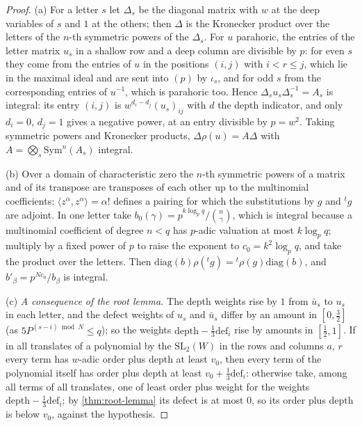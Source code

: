\begin{proof}
(a) For a letter $s$ let $\Delta_s$ be the diagonal matrix with $w$ at the deep variables of $s$ and $1$ at the others; then $\Delta$ is the Kronecker product over the letters of the $n$-th symmetric powers of the $\Delta_s$. For $u$ parahoric, the entries of the letter matrix $u_s$ in a shallow row and a deep column are divisible by $p$: for even $s$ they come from the entries of $u$ in the positions
$(i,j)$ with $i<r\le j$, which lie in the maximal ideal and are sent into $(p)$ by $\iota_s$, and for odd $s$ from the corresponding entries of $u^{-1}$, which is parahoric too. Hence $\Delta_su_s\Delta_s^{-1}=A_s$ is integral: its entry $(i,j)$ is $w^{d_i-d_j}(u_s)_{ij}$ with $d$ the depth indicator, and only $d_i=0$, $d_j=1$ gives a negative power, at an entry divisible by $p=w^2$. Taking symmetric powers
and Kronecker products, $\Delta\rho(u)=A\Delta$ with $A=\bigotimes_s\mathrm{Sym}^n(A_s)$ integral.

(b) Over a domain of characteristic zero the $n$-th symmetric powers of a matrix and of its transpose are transposes of each other up to the multinomial coefficients: $\langle z^\alpha,z^\alpha\rangle=\alpha!$ defines a pairing for which the substitutions by $g$ and ${}^tg$ are adjoint. In one letter take $b_0(\gamma)=p^{k\log_pq}/\binom n\gamma$, which is integral because a multinomial coefficient
of degree $n<q$ has $p$-adic valuation at most $k\log_pq$; multiply by a fixed power of $p$ to raise the exponent to $c_0=k^2\log_pq$, and take the product over the letters. Then $\mathrm{diag}(b)\rho({}^tg)={}^t\rho(g)\mathrm{diag}(b)$, and $b'_\beta=p^{Nc_0}/b_\beta$ is integral.

(c) \emph{A consequence of the root lemma.} The depth weights rise by $1$ from $\bar u_s$ to $u_s$ in each letter, and the defect weights of $u_s$ and $\bar u_s$ differ by an amount in $[0,\frac32]$ (as $5P^{(s-i)\bmod N}\le q$); so the weights $\mathrm{depth}-\frac13\mathrm{def}_i$ rise by amounts in $[\frac12,1]$. If in all translates of a polynomial by the $\mathrm{SL}_2(W)$ in the rows and columns $a$, $r$ every term has $w$-adic order
plus depth at least $v_0$, then every term of the polynomial itself has order plus depth at least $v_0+\frac13\mathrm{def}_i$: otherwise take, among all terms of all translates, one of least order plus weight for the weights $\mathrm{depth}-\frac13\mathrm{def}_i$; by \cref{thm:root-lemma} its defect is at most $0$, so its order plus depth is below $v_0$, against the hypothesis.


\end{proof}

